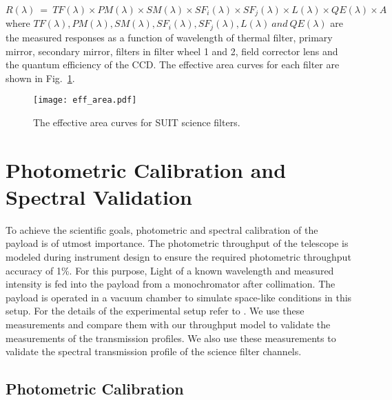 \begin{equation}
    R(\lambda)~=~TF(\lambda)\times PM(\lambda)\times SM(\lambda)\times SF_{i}(\lambda)\times SF_{j}(\lambda)\times L(\lambda)\times QE(\lambda)\times A
    \label{eq:eff_area}
\end{equation}
where $TF(\lambda), PM(\lambda), SM(\lambda), SF_{i}(\lambda), SF_{j}(\lambda), L(\lambda)~and~QE(\lambda)$ are the measured responses as a function of wavelength of thermal filter, primary mirror, secondary mirror, filters in filter wheel 1 and 2, field corrector lens and the quantum efficiency of the CCD. The effective area curves for each filter are shown in Fig.~\ref{fig:eff_area}.

\begin{figure}
    \centering
    \texttt{[image: eff\_area.pdf]}
    \caption{The effective area curves for SUIT science filters.}
    \label{fig:eff_area}
\end{figure}

\section{Photometric Calibration and Spectral Validation {\suit}}\label{sec:suit_radiometric}

To achieve the scientific goals, photometric and spectral calibration of the payload is of utmost importance. The photometric throughput of the telescope is modeled during instrument design to ensure the required photometric throughput accuracy of 1\%. For this purpose, Light of a known wavelength and measured intensity is fed into the payload from a monochromator after collimation. The payload is operated in a vacuum chamber to simulate space-like conditions in this setup. For the details of the experimental setup refer to \cite{sarkar24}. We use these measurements and compare them with our throughput model to validate the measurements of the transmission profiles. We also use these measurements to validate the spectral transmission profile of the science filter channels.

\subsection{Photometric Calibration}\label{sec:calibration}

